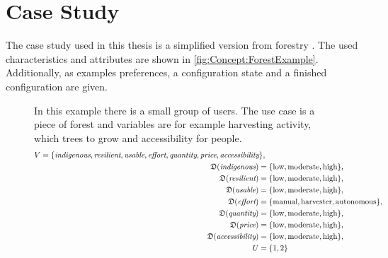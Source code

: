 \section{Case Study}
\label{sec:Concept:CaseStudy}

The case study used in this thesis is a simplified version from forestry .
The used characteristics and attributes are shown in \autoref{fig:Concept:ForestExample}. Additionally, as examples preferences, a configuration state and a finished configuration are given.

\begin{figure}
    \begin{mdframed}[frametitle={Example for Forestry Use Case}, linecolor=black, frametitlerulecolor=black, frametitlebackgroundcolor=gray!5]
        In this example there is a small group of users. The use case is a piece of forest and variables are for example harvesting activity, which trees to grow and accessibility for people.
        \begin{align}
            \begin{split}
                V = \{ & \textit{indigenous}, \textit{resilient}, \textit{usable}, \textit{effort}, \textit{quantity}, \textit{price}, \textit{accessibility} \},
            \end{split} \notag \\
            \mathfrak{D}(\textit{indigenous}) =  \{ & \text{low}, \text{moderate}, \text{high}\}, \notag \\
            \mathfrak{D}(\textit{resilient}) = \{ & \text{low}, \text{moderate}, \text{high}\}, \notag \\
            \mathfrak{D}(\textit{usable}) = \{ & \text{low}, \text{moderate}, \text{high}\}, \notag \\
            \mathfrak{D}(\textit{effort}) = \{ & \text{manual}, \text{harvester}, \text{autonomous}\}, \notag \\
            \mathfrak{D}(\textit{quantity}) = \{ & \text{low}, \text{moderate}, \text{high}\}, \notag \\
            \mathfrak{D}(\textit{price}) = \{ & \text{low}, \text{moderate}, \text{high}\}, \notag\\
            \mathfrak{D}(\textit{accessibility}) = \{ & \text{low}, \text{moderate}, \text{high}\},\notag \\
            U = \{ & 1,2\} \notag\\

\end{align}
\end{mdframed}
\end{figure}
